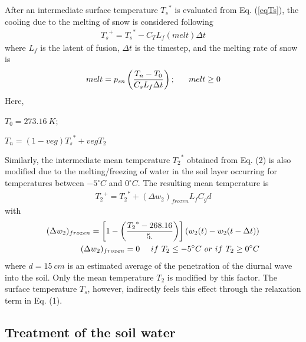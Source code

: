 After an intermediate surface
temperature ${T_s}^*$ is evaluated from Eq. (\ref{eqTs}), the cooling
due to the melting of snow is considered following
\begin{eqnarray}
{T_s}^+ = {T_s}^* - C_T L_f (melt) \Delta t
\end{eqnarray}
where $L_f$ is the latent of fusion, $\Delta t$ is the timestep,
and the melting rate of snow is
\begin{eqnarray}
melt = p_{sn} \left( { T_n - T_0 \over C_s L_f \Delta t } \right); \ \ \ \ \
melt \geq 0
\end{eqnarray}
Here,
\par $T_0=273.16 \ K$;
\par $T_n = (1-veg) {T_s}^* + veg T_2$

Similarly, the intermediate mean temperature ${T_2}^*$ obtained
from Eq. (2) is also modified due to the melting/freezing of
water in the soil layer occurring for temperatures
between $-5^\circ C$ and $0^\circ C$.
The resulting mean temperature is
\begin{eqnarray}
{T_2}^+ = {T_2}^* + (\Delta w_2)_{frozen} L_f C_g d
\end{eqnarray}
with
\begin{eqnarray}
(\Delta w_2)_{frozen} = \left[ 1 - \left( { {T_2}^*-268.16
\over 5. } \right) \right] \left( w_2(t) - w_2(t-\Delta t) \right) \\
(\Delta w_2)_{frozen} = 0  \ \ \ \ if \ T_2 \leq -5^\circ C \
or \ if \ T_2 \geq 0^\circ C
\end{eqnarray}
where $d=15 \ cm$ is an estimated average of the penetration of the
diurnal wave into the soil.
Only the mean temperature $T_2$ is modified
by this factor.
The surface temperature $T_s$, however, indirectly
feels this effect through the relaxation term in Eq. (1).

\subsection{Treatment of the soil water}

